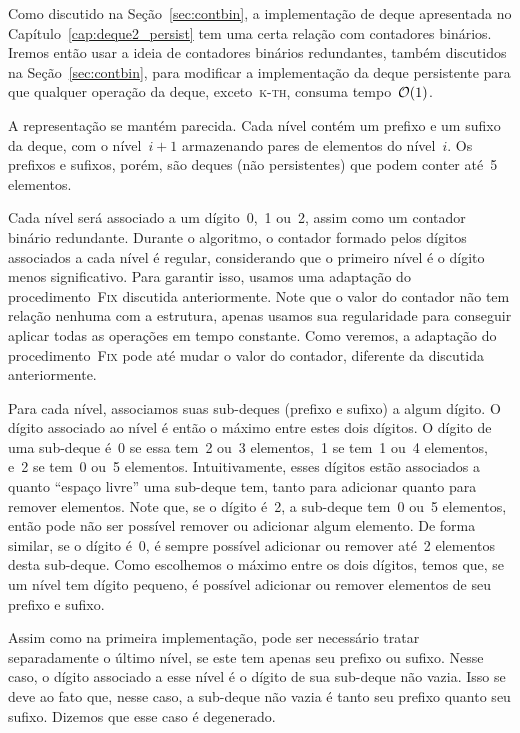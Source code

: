 \documentclass[main.tex]{subfiles}
\begin{document}
Como discutido na Seção~\ref{sec:contbin}, a implementação de deque apresentada no Capítulo~\ref{cap:deque2_persist} tem uma certa relação com contadores binários. Iremos então usar a ideia de contadores binários redundantes, também discutidos na Seção~\ref{sec:contbin}, para modificar a implementação da deque persistente para que qualquer operação da deque, exceto~\textsc{k-th}, consuma tempo~$\mathcal{O}(1)$.

A representação se mantém parecida. Cada nível contém um prefixo e um sufixo da deque, com o nível~$i+1$ armazenando pares de elementos do nível~$i$. Os prefixos e sufixos, porém, são deques (não persistentes) que podem conter até~5 elementos.

Cada nível será associado a um dígito~0,~1 ou~2, assim como um contador binário redundante. Durante o algoritmo, o contador formado pelos dígitos associados a cada nível é regular, considerando que o primeiro nível é o dígito menos significativo. Para garantir isso, usamos uma adaptação do procedimento~\textsc{Fix} discutida anteriormente. Note que o valor do contador não tem relação nenhuma com a estrutura, apenas usamos sua regularidade para conseguir aplicar todas as operações em tempo constante. Como veremos, a adaptação do procedimento~\textsc{Fix} pode até mudar o valor do contador, diferente da discutida anteriormente.

Para cada nível, associamos suas sub-deques (prefixo e sufixo) a algum dígito. O dígito associado ao nível é então o máximo entre estes dois dígitos. O dígito de uma sub-deque é~0 se essa tem~2 ou~3 elementos,~1 se tem~1 ou~4 elementos, e~2 se tem~0 ou~5 elementos. Intuitivamente, esses dígitos estão associados a quanto ``espaço livre'' uma sub-deque tem, tanto para adicionar quanto para remover elementos. Note que, se o dígito é~2, a sub-deque tem~0 ou~5 elementos, então pode não ser possível remover ou adicionar algum elemento. De forma similar, se o dígito é~0, é sempre possível adicionar ou remover até~2 elementos desta sub-deque. Como escolhemos o máximo entre os dois dígitos, temos que, se um nível tem dígito pequeno, é possível adicionar ou remover elementos de seu prefixo e sufixo.

Assim como na primeira implementação, pode ser necessário tratar separadamente o último nível, se este tem apenas seu prefixo ou sufixo. Nesse caso, o dígito associado a esse nível é o dígito de sua sub-deque não vazia. Isso se deve ao fato que, nesse caso, a sub-deque não vazia é tanto seu prefixo quanto seu sufixo. Dizemos que esse caso é degenerado.
\end{document}
